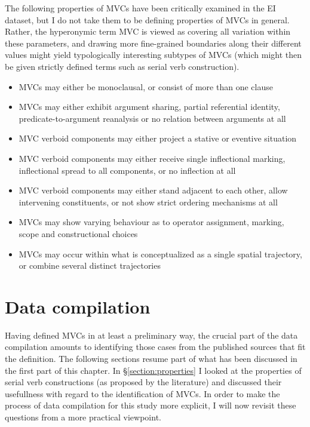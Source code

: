 The following properties of MVCs have been critically examined in the EI dataset, but I do not take them to be defining properties of MVCs in general. Rather, the hyperonymic term MVC is viewed as covering all variation within these parameters, and drawing more fine-grained boundaries along their different values might yield typologically interesting subtypes of MVCs (which might then be given strictly defined terms such as serial verb construction).

\begin{itemize}
\item MVCs may either be monoclausal, or consist of more than one clause
\item MVCs may either exhibit argument sharing, partial referential identity, predicate-to-argument reanalysis or no relation between arguments at all
\item MVC verboid components may either project a stative or eventive situation
\item MVC verboid components may either receive single inflectional marking, inflectional spread to all components, or no inflection at all
\item MVC verboid components may either stand adjacent to each other, allow intervening constituents, or not show strict ordering mechanisms at all
\item MVCs may show varying behaviour as to operator assignment, marking, scope and constructional choices
\item MVCs may occur within what is conceptualized as a single spatial trajectory, or combine several distinct trajectories 
\end{itemize}

\section{Data compilation}

Having defined MVCs in at least a preliminary way, the crucial part of the data compilation amounts to identifying those cases from the published sources that fit the definition. The following sections resume part of what has been discussed in the first part of this chapter. In §\ref{section:properties} I looked at the properties of serial verb constructions (as proposed by the literature) and discussed their usefullness with regard to the identification of MVCs. In order to make the process of data compilation for this study more explicit, I will now revisit these questions from a more practical viewpoint.

